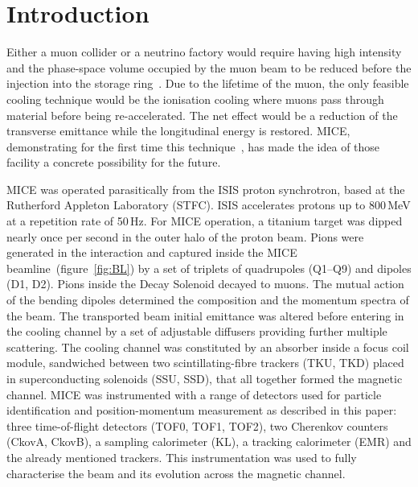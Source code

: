 \section{Introduction}
\label{Sect:Intro}

Either a muon collider or a neutrino factory would require having high intensity and the phase-space volume occupied by the muon beam to be reduced before the injection into the storage ring~\cite{Geer:1998PhRvD..57.6989G}.
Due to the lifetime of the muon, the only feasible cooling technique would be the ionisation cooling \cite{Neuffer:1983jr} where muons pass through material before being re-accelerated. The net effect would be a reduction of the transverse emittance while the longitudinal energy is restored.
MICE, demonstrating for the first time this technique~\cite{Bogomilov:2019kfj}, has made the idea of those facility a concrete possibility for the future.

MICE was operated parasitically from the ISIS proton synchrotron, based at the Rutherford Appleton Laboratory (STFC).
ISIS accelerates protons up to 800\,MeV at a repetition rate of 50\,Hz. For MICE operation, a titanium target was dipped nearly once per second in the outer halo of the proton beam.
Pions were generated in the interaction and captured inside the MICE beamline~(figure~\ref{fig:BL}) by a set of triplets of quadrupoles (Q1--Q9) and dipoles (D1, D2).
Pions inside the Decay Solenoid decayed to muons. The mutual action of the bending dipoles determined the composition and the momentum spectra of the beam.
The transported beam initial emittance was altered before entering in the cooling channel by a set of adjustable diffusers providing further multiple scattering.
The cooling channel was constituted by an absorber inside a focus coil module, sandwiched between two scintillating-fibre trackers (TKU, TKD) placed in superconducting solenoids (SSU, SSD), that all together formed the magnetic channel.
MICE was instrumented with a range of detectors used for particle identification and position-momentum measurement as described in this paper: three time-of-flight detectors (TOF0, TOF1, TOF2), two Cherenkov counters (CkovA, CkovB), a sampling calorimeter (KL), a tracking calorimeter (EMR) and the already mentioned trackers.
This instrumentation was used to fully characterise the beam and its evolution across the magnetic channel.
